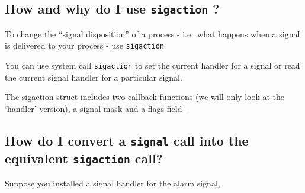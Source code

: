 \subsection{\texorpdfstring{How and why do I use \texttt{sigaction}
?}{How and why do I use sigaction ?}}\label{how-and-why-do-i-use-sigaction}

To change the ``signal disposition'' of a process - i.e.~what happens
when a signal is delivered to your process - use \texttt{sigaction}

You can use system call \texttt{sigaction} to set the current handler
for a signal or read the current signal handler for a particular signal.

\begin{Shaded}
\begin{Highlighting}[]
     
\end{Highlighting}
\end{Shaded}

The sigaction struct includes two callback functions (we will only look
at the `handler' version), a signal mask and a flags field -

\begin{Shaded}
\begin{Highlighting}[]
 
                    \NormalTok{);}
                     \NormalTok{*);}
                       
\NormalTok{\}; }
\end{Highlighting}
\end{Shaded}

\subsection{\texorpdfstring{How do I convert a \texttt{signal} call into
the equivalent \texttt{sigaction}
call?}{How do I convert a signal call into the equivalent sigaction call?}}\label{how-do-i-convert-a-signal-call-into-the-equivalent-sigaction-call}

Suppose you installed a signal handler for the alarm signal,

\begin{Shaded}
\begin{Highlighting}[]
\end{Highlighting}
\end{Shaded}

